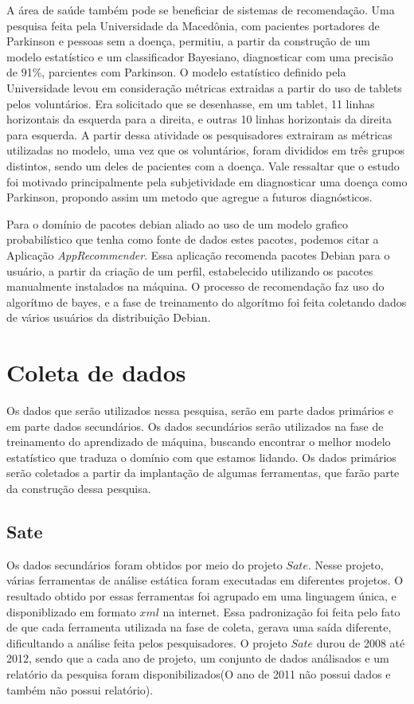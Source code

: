 A área de saúde também pode se beneficiar de sistemas de recomendação. Uma pesquisa feita pela Universidade da Macedônia,  com pacientes portadores de Parkinson e pessoas sem a doença, permitiu, a partir da construção de um modelo estatístico e um classificador Bayesiano, diagnosticar com uma precisão de 91\%, parcientes com Parkinson\cite{Kotsavasiloglou}. O modelo estatístico definido pela Universidade levou em consideração métricas extraidas a partir do uso de tablets pelos voluntários. Era solicitado que se desenhasse, em um tablet, 11 linhas horizontais da esquerda para a direita, e outras 10 linhas horizontais da direita para esquerda. A partir dessa atividade os pesquisadores extrairam as métricas utilizadas no modelo, uma vez que os voluntários, foram divididos em três grupos distintos, sendo um deles de pacientes com a doença. Vale ressaltar que o estudo foi motivado principalmente pela subjetividade em diagnosticar uma doença como Parkinson, propondo assim um metodo que agregue a futuros diagnósticos.

Para o domínio de pacotes debian aliado ao uso de um modelo grafico probabilístico que tenha como fonte de dados estes pacotes, podemos citar a Aplicação \textit{AppRecommender}. Essa aplicação recomenda pacotes Debian para o usuário,
a partir da criação de um perfil, estabelecido utilizando os pacotes manualmente instalados na máquina.
O processo de recomendação faz uso do algorítmo de bayes, e a fase de treinamento do algorítmo foi feita coletando dados de vários usuários da distribuição Debian.

\section{Coleta de dados}
Os dados que serão utilizados nessa pesquisa, serão em parte dados primários e em parte dados secundários. Os dados secundários serão utilizados na fase de treinamento do aprendizado de máquina, buscando encontrar o melhor modelo estatístico que traduza o domínio com que estamos lidando. Os dados primários serão coletados a partir da implantação de algumas ferramentas, que farão parte da construção dessa pesquisa.

\subsection{Sate}
Os dados secundários foram obtidos por meio do projeto $Sate$. Nesse projeto, várias ferramentas de análise estática foram executadas em diferentes projetos. O resultado obtido por essas ferramentas foi agrupado em uma linguagem única, e disponiblizado em formato $xml$ na internet. Essa padronização foi feita pelo fato de que cada ferramenta utilizada na fase de coleta, gerava uma saída diferente, dificultando a análise feita pelos pesquisadores. O projeto $Sate$ durou de 2008 até 2012, sendo que a cada ano de projeto, um conjunto de dados análisados e um relatório da pesquisa foram disponibilizados(O ano de 2011 não possui dados e também não possui relatório).

